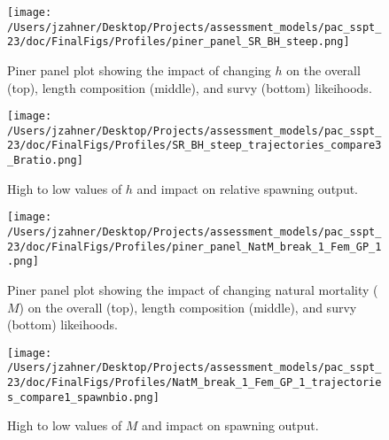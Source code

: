 \documentclass[11pt,
  letterpaper,
]{article}
\begin{document}
\begin{figure}
{\centering
\texttt{[image: /Users/jzahner/Desktop/Projects/assessment\_models/pac\_sspt\_23/doc/FinalFigs/Profiles/piner\_panel\_SR\_BH\_steep.png]}
}
\caption{Piner panel plot showing the impact of changing $h$ on the overall (top), length composition (middle), and survy (bottom) likeihoods.\label{fig:h_piner_prof}}
\end{figure}

\begin{figure}
{\centering
\texttt{[image: /Users/jzahner/Desktop/Projects/assessment\_models/pac\_sspt\_23/doc/FinalFigs/Profiles/SR\_BH\_steep\_trajectories\_compare3\_Bratio.png]}
}
\caption{High to low values of $h$ and impact on relative spawning output.\label{fig:h_spawnout}}
\end{figure}

\begin{figure}
{\centering
\texttt{[image: /Users/jzahner/Desktop/Projects/assessment\_models/pac\_sspt\_23/doc/FinalFigs/Profiles/piner\_panel\_NatM\_break\_1\_Fem\_GP\_1.png]}
}
\caption{Piner panel plot showing the impact of changing natural mortality ($M$) on the overall (top), length composition (middle), and survy (bottom) likeihoods.\label{fig:M_prof}}
\end{figure}

\begin{figure}
{\centering
\texttt{[image: /Users/jzahner/Desktop/Projects/assessment\_models/pac\_sspt\_23/doc/FinalFigs/Profiles/NatM\_break\_1\_Fem\_GP\_1\_trajectories\_compare1\_spawnbio.png]}
}
\caption{High to low values of $M$ and impact on spawning output.\label{fig:M_spawnout}}
\end{figure}
\end{document}
